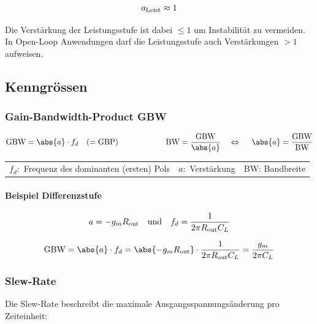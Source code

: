 \[
    a_{\rm Leist} \approx 1
\]

Die Verstärkung der Leistungsstufe ist dabei $\leq 1$ um Instabilität zu vermeiden. \\
In Open-Loop Anwendungen darf die Leistungsstufe auch Verstärkungen $>1$ aufweisen.


\subsection{Kenngrössen}

\subsubsection{Gain-Bandwidth-Product GBW}
\vspace{-0.2cm}

\[
    \text{GBW} = \abs{a} \cdot  f_d \quad (= \text{GBP}) 
    \qquad \qquad \qquad
    \text{BW} = \frac{\text{GBW}}{\abs{a}} \quad \Leftrightarrow\ \quad \abs{a} = \frac{\text{GBW}}{\text{BW}} 
\]


\begin{tabular}{l | l | l}
    $f_d:$ Frequenz des dominanten (ersten) Pols    & $a:$ Verstärkung   & BW: Bandbreite           
\end{tabular}





\paragraph{Beispiel Differenzstufe}
\[
    a = -g_m R_{\rm out} \quad \text{und} \quad f_d = \frac{1}{2 \pi R_{\rm out} C_L}
\]
\begin{center}
    \textdownarrow
\end{center}
\[
    \text{GBW} = \abs{a} \cdot f_d = \abs{-g_m R_{\rm out}} \cdot \frac{1}{2 \pi R_{\rm out} C_L} = \frac{g_m}{2 \pi C_L}
\]

\subsubsection{Slew-Rate}
Die Slew-Rate beschreibt die maximale Ausgangsspannungsänderung pro Zeiteinheit:

